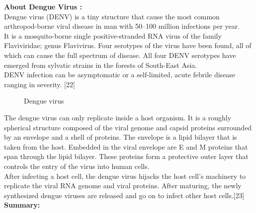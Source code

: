 \documentclass[11pt]{exam}
\begin{document}
\begin{questions}
\textbf{About Dengue Virus :} \\
Dengue virus (DENV) is a tiny structure that cause the most common arthropod-borne viral disease in man with 50–100 million infections per year. \\
It is a mosquito-borne single positive-stranded RNA virus of the family Flaviviridae; genus Flavivirus. Four serotypes of the virus have been found, all of which can cause the full spectrum of disease. All four DENV serotypes have emerged from sylvatic strains in the forests of South-East Asia. \\
DENV infection can be asymptomatic or a self-limited, acute febrile disease ranging in severity. [22]\\
\begin{figure}[H]
  \centering
  \hfill
  \hfill
  \caption{Dengue virus}
  \label{Dengue vectors }
\end{figure} 

The dengue virus can only replicate inside a host organism. It is a roughly spherical structure composed of the viral genome and capsid proteins surrounded by an envelope and a shell of proteins. The envelope is a lipid bilayer that is taken from the host. Embedded in the viral envelope are E and M proteins that span through the lipid bilayer. These proteins form a protective outer layer that controls the entry of the virus into human cells. \\
After infecting a host cell, the dengue virus hijacks the host cell's machinery to replicate the viral RNA genome and viral proteins. After maturing, the newly synthesized dengue viruses are released and go on to infect other host cells.[23]\\

\textbf{Summary:} \\
\\ \\ \\


\end{questions}
\end{document}
